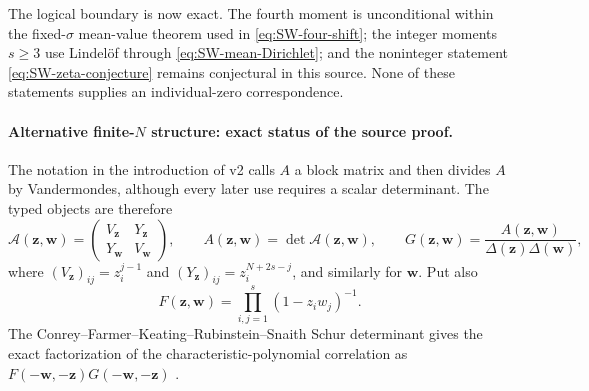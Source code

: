 The logical boundary is now exact.  The fourth moment is unconditional within the
fixed-$\sigma$ mean-value theorem used in \eqref{eq:SW-four-shift}; the integer moments
$s\geq3$ use Lindel\"of through \eqref{eq:SW-mean-Dirichlet}; and the noninteger statement
\eqref{eq:SW-zeta-conjecture} remains conjectural in this source.  None of these statements
supplies an individual-zero correspondence.

\paragraph{Alternative finite-$N$ structure: exact status of the source proof.}
The notation in the introduction of v2 calls $A$ a block matrix and then divides $A$ by
Vandermondes, although every later use requires a scalar determinant.  The typed objects are
therefore
\begin{equation}
 \mathcal A(\mathbf z,\mathbf w)=
 \begin{pmatrix}V_{\mathbf z}&Y_{\mathbf z}\\Y_{\mathbf w}&V_{\mathbf w}\end{pmatrix},
 \qquad
 A(\mathbf z,\mathbf w)=\det\mathcal A(\mathbf z,\mathbf w),
 \qquad
 G(\mathbf z,\mathbf w)=\frac{A(\mathbf z,\mathbf w)}
 {\Delta(\mathbf z)\Delta(\mathbf w)},
 \label{eq:SW-A-G-corrected}
\end{equation}
where $(V_{\mathbf z})_{ij}=z_i^{j-1}$ and
$(Y_{\mathbf z})_{ij}=z_i^{N+2s-j}$, and similarly for $\mathbf w$.  Put also
\begin{equation}
 F(\mathbf z,\mathbf w)=\prod_{i,j=1}^{s}(1-z_iw_j)^{-1}.
\end{equation}
The Conrey--Farmer--Keating--Rubinstein--Snaith Schur determinant gives the exact factorization
of the characteristic-polynomial correlation as $F(-\mathbf w,-\mathbf z)G(-\mathbf
w,-\mathbf z)$ \cite{conreyFarmerKeatingRubinsteinSnaith2003}.

